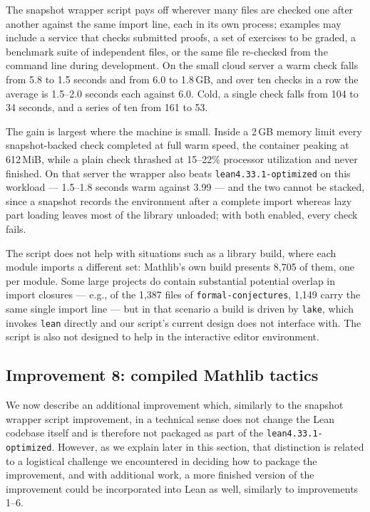 \documentclass{article}
\newcommand{\Lean}{Lean\xspace}      %
\newcommand{\lean}{\texttt{lean}\xspace}      %
\newcommand{\lake}{\texttt{lake}\xspace}      %
\newcommand{\mathlib}{Mathlib\xspace}
\newcommand{\altlean}{\texttt{lean4.33.1-\allowbreak optimized}\xspace}
\begin{document}
The snapshot wrapper script pays off wherever many files are checked one after another against the same import line, each in its own process; examples may include a service that checks submitted proofs, a set of exercises to be graded, a benchmark suite of independent files, or the same file re-checked from the command line during development. On the small cloud server a warm check falls from 5.8 to 1.5 seconds and from 6.0 to 1.8\,GB, and over ten checks in a row the average is 1.5--2.0 seconds each against 6.0. Cold, a single check falls from 104 to 34 seconds, and a series of ten from 161 to 53.

The gain is largest where the machine is small. Inside a 2\,GB memory limit every snapshot-backed check completed at full warm speed, the container peaking at 612\,MiB, while a plain check thrashed at 15--22\% processor utilization and never finished. On that server the wrapper also beats \altlean on this workload --- 1.5--1.8 seconds warm against 3.99 --- and the two cannot be stacked, since a snapshot records the environment after a complete import whereas lazy part loading leaves most of the library unloaded; with both enabled, every check fails.

The script does not help with situations such as a library build, where each module imports a different set: \mathlib's own build presents 8{,}705 of them, one per module. Some large projects do contain substantial potential overlap in import closures --- e.g., of the 1{,}387 files of \texttt{formal-conjectures}, 1{,}149 carry the same single import line --- but in that scenario a build is driven by \lake, which invokes \lean directly and our script's current design does not interface with. The script is also not designed to help in the interactive editor environment.

\subsection{Improvement 8: compiled \mathlib tactics}
\label{sec:tn-8}

We now describe an additional improvement which, similarly to the snapshot wrapper script improvement, in a technical sense does not change the \Lean codebase itself and is therefore not packaged as part of the \altlean. However, as we explain later in this section, that distinction is related to a logistical challenge  we encountered in deciding how to package the improvement, and with additional work, a more finished version of the improvement could be incorporated into \Lean as well, similarly to improvements 1--6.
\end{document}
